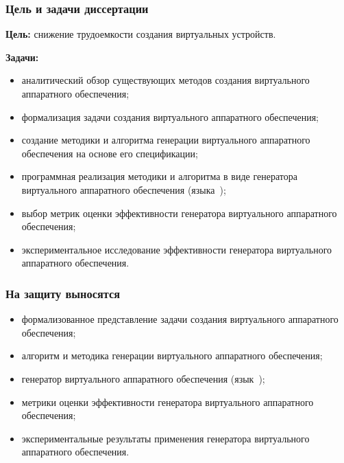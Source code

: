 \begin{frame}%
    \frametitle{Цель и задачи диссертации}
    \textbf{Цель:} снижение трудоемкости создания виртуальных устройств.

    \textbf{Задачи:}
    \begin{itemize}
        \item аналитический обзор существующих методов создания виртуального аппаратного обеспечения;
        \item формализация задачи создания виртуального аппаратного обеспечения;
        \item создание методики и алгоритма генерации виртуального аппаратного обеспечения на основе его спецификации;
        \item программная реализация методики и алгоритма в виде генератора
              виртуального аппаратного обеспечения \mbox{(языка {\mylanguage});}
        \item выбор метрик оценки эффективности генератора виртуального аппаратного обеспечения;
        \item экспериментальное исследование эффективности генератора виртуального аппаратного обеспечения.
    \end{itemize}
\end{frame}


\begin{frame}%
    \frametitle{На защиту выносятся}
    \begin{itemize}
        \item формализованное представление задачи создания виртуального аппаратного обеспечения;
        \item алгоритм и методика генерации виртуального аппаратного обеспечения;
        \item генератор виртуального аппаратного обеспечения \mbox{(язык {\mylanguage});}
        \item метрики оценки эффективности генератора виртуального аппаратного обеспечения;
        \item экспериментальные результаты применения генератора виртуального аппаратного обеспечения.
    \end{itemize}
\end{frame}



